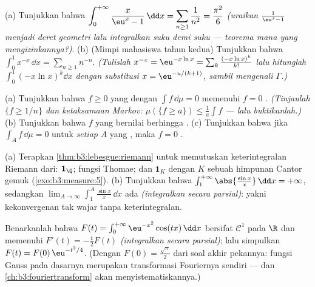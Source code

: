 \begin{exercise}[$\star\star$]\label{exo:b3:lebesgue:4}
(a) Tunjukkan bahwa $\displaystyle\int_0^{+\infty}\frac{x}{\eu^x -
1}\,\dd x = \sum_{n\geq1}\frac1{n^2} = \frac{\pi^2}6$
\emph{(uraikan $\frac1{\eu^x - 1}$ menjadi deret geometri lalu
integralkan suku demi suku --- teorema mana yang mengizinkannya?)}.
(b) (Mimpi mahasiswa tahun kedua) Tunjukkan bahwa
$\displaystyle\int_0^1 x^{-x}\,\dd x = \sum_{n\geq1}n^{-n}$.
\emph{(Tulislah $x^{-x} = \eu^{-x\ln x} = \sum_k\frac{(-x\ln
x)^k}{k!}$ lalu hitunglah $\int_0^1(-x\ln x)^k\dd x$ dengan
substitusi $x = \eu^{-u/(k+1)}$, sambil mengenali $\Gamma$.)}
\end{exercise}

\begin{exercise}[$\star\star$]\label{exo:b3:lebesgue:5}
(a) Tunjukkan bahwa $f \geq 0$ yang  dengan $\int f\,\dd\mu = 0$
memenuhi $f = 0$ . \emph{(Tinjaulah $\{f \geq 1/n\}$ dan
ketaksamaan Markov: $\mu(\{f \geq a\}) \leq \frac1a\int f$ ---
lalu buktikanlah.)}
(b) Tunjukkan bahwa $f$ yang  bernilai berhingga .
(c) Tunjukkan bahwa jika $\int_A f\,\dd\mu = 0$ untuk \emph{setiap}
$A$ yang , maka $f = 0$ .
\end{exercise}

\begin{exercise}[$\star\star$]\label{exo:b3:lebesgue:6}
(a) Terapkan \cref{thm:b3:lebesgue:riemann} untuk memutuskan keterintegralan
Riemann dari: $\mathbf 1_\Q$; fungsi Thomae; dan $\mathbf
1_K$ dengan $K$ sebuah himpunan Cantor gemuk (\cref{exo:b3:measure:5}).
(b) Tunjukkan bahwa $\int_1^{+\infty}\abs{\frac{\sin x}x}\,\dd x =
+\infty$, sedangkan $\lim_{A\to\infty}\int_1^A\frac{\sin
x}x\,\dd x$ ada \emph{(integralkan secara parsial)}: yakni kekonvergenan
tak wajar tanpa keterintegralan.
\end{exercise}

\begin{exercise}[$\star\star$]\label{exo:b3:lebesgue:7}
Benarkanlah bahwa $F(t) = \int_0^{+\infty}\eu^{-x^2}\cos(tx)\,\dd x$
bersifat $\mathcal C^1$ pada $\R$ dan memenuhi $F'(t) = -\frac t2F(t)$
\emph{(integralkan secara parsial)}; lalu simpulkan $F(t) =
F(0)\,\eu^{-t^2/4}$. (Dengan $F(0) = \frac{\sqrt\pi}2$ dari
soal akhir pekannya: fungsi Gauss pada dasarnya merupakan transformasi
Fouriernya sendiri --- dan \cref{ch:b3:fouriertransform} akan
menyistematiskannya.)
\end{exercise}

